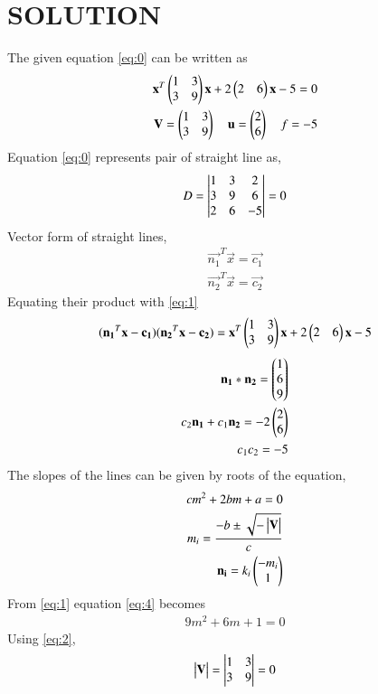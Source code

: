 \documentclass[journal,12pt,twocolumn]{IEEEtran}
\begin{document}
\section{SOLUTION}
The given equation \eqref{eq:0} can be written as
\begin{align}
\mathbf{x}^T\begin{pmatrix}1 & 3 \\ 3 & 9\end{pmatrix}\mathbf{x} +2\begin{pmatrix}2 &6\end{pmatrix}\mathbf{x}-5=0\label{eq:1}\\
\mathbf{V} = \begin{pmatrix}1 & 3 \\ 3 & 9\end{pmatrix} \quad \mathbf{u} = \begin{pmatrix}2 \\ 6\end{pmatrix} \quad f= -5 \label{eq:2}
\end{align}
Equation \eqref{eq:0} represents pair of straight line as,
\begin{align}
D = \begin{vmatrix}1&3&2\\3&9&6\\2&6&-5\end{vmatrix} = 0
\end{align}
Vector form of straight lines,
\begin{align}
\vec{n_1}^T\vec{x}= \vec{c_1}\\
\vec{n_2}^T\vec{x} = \vec{c_2}
\end{align}
Equating their product with \eqref{eq:1}
\begin{align}
(\mathbf{n_1}^T\mathbf{x} -\mathbf{c_1})(\mathbf{n_2}^T\mathbf{x} - \mathbf{c_2})= \mathbf{x}^T\begin{pmatrix}1 & 3 \\ 3 & 9\end{pmatrix}\mathbf{x} +2\begin{pmatrix}2 &6\end{pmatrix}\mathbf{x}-5
\end{align}
\begin{align}
\mathbf{n_1}*\mathbf{n_2}=\begin{pmatrix}1\\6\\9\end{pmatrix}\label{eq:3}\\
c_2\mathbf{n_1}+c_1\mathbf{n_2} = -2\begin{pmatrix}2\\6\end{pmatrix}\\
c_1c_2 = -5
\end{align}
The slopes of the lines can be given by roots of the equation,
\begin{align} 
cm^2+2bm+a=0 \label{eq:4}\\
m_i = \frac{-b\pm \sqrt{-\begin{vmatrix}\mathbf{V}\end{vmatrix}}}{c}\label{eq:5}\\
\mathbf{n_i}=k_i\begin{pmatrix}-m_i\\1\end{pmatrix}\label{eq:6}
\end{align}
From \eqref{eq:1} equation \eqref{eq:4} becomes
\begin{align}
9m^2+6m+1=0
\end{align}
Using \eqref{eq:2},
\begin{align}
\begin{vmatrix}\mathbf{V}\end{vmatrix} = \begin{vmatrix}1 & 3\\ 3 & 9\end{vmatrix} = 0
\end{align}
\end{document}
